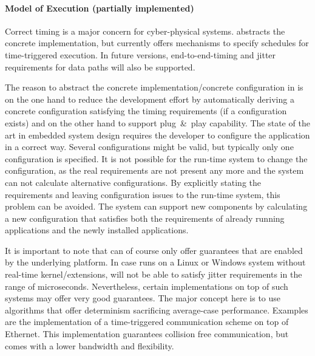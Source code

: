 
\paragraph{Model of Execution (partially implemented)}
Correct timing is a major concern for cyber-physical systems.
\xme abstracts the concrete implementation, but currently offers mechanisms to specify schedules for time-triggered execution.
In future versions, end-to-end-timing and jitter requirements for data paths will also be supported.

The reason to abstract the concrete implementation/concrete configuration
in \xme is on the one hand to reduce the development effort by automatically deriving a concrete configuration satisfying the timing
requirements (if a configuration exists) and on the other hand to support plug~\&~play capability. The state of the art in embedded system
design requires the developer to configure the application in a correct way. Several configurations might be valid, but typically only one
configuration is specified. It is not possible for the run-time system to change the configuration, as the real requirements are not present
any more and the system can not calculate alternative configurations. By explicitly stating the requirements and leaving configuration issues
to the run-time system, this problem can be avoided.
The system can support new components by calculating a new configuration that satisfies both
the requirements of already running applications and the newly installed applications.

It is important to note that \xme can of course only offer guarantees that are enabled by the underlying platform.
In case \xme runs on a Linux or Windows system without real-time kernel/extensions,
\xme will not be able to satisfy jitter requirements in the range of microseconds.
Nevertheless, certain implementations on top of such systems may offer very good guarantees.
The major concept here is to use algorithms that offer determinism sacrificing average-case performance.
Examples are the implementation of a time-triggered communication scheme on top of Ethernet.
This implementation guarantees collision free communication, but comes with a lower bandwidth and flexibility.

